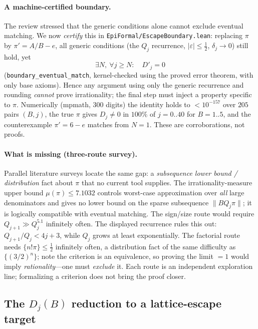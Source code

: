 \documentclass[11pt]{amsart}
\theoremstyle{definition}
\theoremstyle{remark}
\numberwithin{equation}{section}
\begin{document}
\paragraph{A machine-certified boundary.} The review stressed that the generic conditions alone cannot exclude eventual matching. We now \emph{certify} this in \texttt{EpiFormal/\allowbreak{}EscapeBoundary.lean}: replacing $\pi$ by $\pi'=A/B-e$, all generic conditions (the $Q_j$ recurrence, $|\varepsilon|\le\tfrac12$, $\delta_j\to0$) still hold, yet
\[
\exists N,\ \forall j\ge N:\quad D'_j=0
\]
(\texttt{boundary\_eventual\_match}, kernel-checked using the proved error theorem, with only base axioms). Hence any argument using only the generic recurrence and rounding \emph{cannot} prove irrationality; the final step must inject a property specific to $\pi$. Numerically (mpmath, 300 digits) the identity holds to $<10^{-157}$ over $205$ pairs $(B,j)$, the true $\pi$ gives $D_j\neq0$ in $100\%$ of $j=0..40$ for $B=1..5$, and the counterexample $\pi'=6-e$ matches from $N=1$. These are corroborations, not proofs.

\paragraph{What is missing (three-route survey).} Parallel literature surveys locate the same gap: a \emph{subsequence lower bound / distribution} fact about $\pi$ that no current tool supplies. The irrationality-measure upper bound $\mu(\pi)\le7.1032$ controls worst-case approximation over \emph{all} large denominators and gives no lower bound on the sparse subsequence $\|BQ_j\pi\|$; it is logically compatible with eventual matching. The sign/size route would require $Q_{j+1}\gg Q_j^{5.1}$  infinitely often. The displayed recurrence rules this out: $Q_{j+1}/Q_j<4j+3$, while $Q_j$ grows at least exponentially. The factorial route needs $\{n!\pi\}\le\tfrac12$ infinitely often, a distribution fact of the same difficulty as $\{(3/2)^n\}$; note the criterion is an equivalence, so proving the limit $=1$ would imply \emph{rationality}---one must \emph{exclude} it. Each route is an independent exploration line; formalizing a criterion does not bring the proof closer.

\subsection{The \texorpdfstring{$D_j(B)$}{Dj(B)} reduction to a lattice-escape target}\label{sec:lean-reduction}
\end{document}
